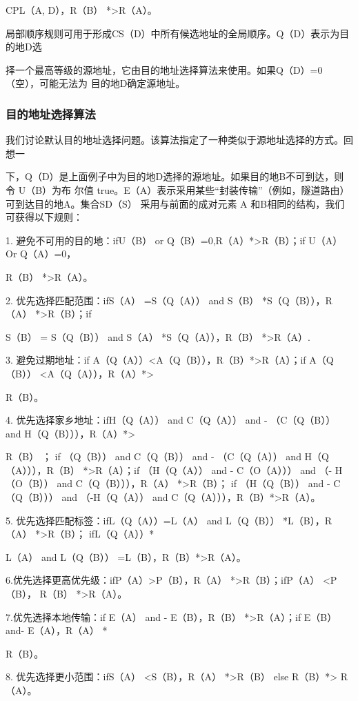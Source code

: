 CPL（A, D），R（B） *>R（A）。

局部顺序规则可用于形成CS（D）中所有候选地址的全局顺序。Q（D）表示为目的地D选

择一个最高等级的源地址，它由目的地址选择算法来使用。如果Q（D）=0（空），可能无法为
目的地D确定源地址。

\subsubsection{目的地址选择算法}
我们讨论默认目的地址选择问题。该算法指定了一种类似于源地址选择的方式。回想一

下，Q（D）是上面例子中为目的地D选择的源地址。如果目的地B不可到达，则令 U（B）为布
尔值 true。E（A）表示采用某些“封装传输”（例如，隧道路由）可到达目的地A。集合SD（S）
采用与前面的成对元素 A 和B相同的结构，我们可获得以下规则：

1. 避免不可用的目的地：ifU（B） or Q（B）=0,R（A）*>R（B）；if U（A） Or Q（A）=0，

R（B） *>R（A）。

2. 优先选择匹配范围：ifS（A） =S（Q（A）） and S（B） *S（Q（B）），R（A） *>R（B）；if

S（B） = S（Q（B）） and S（A） *S（Q（A）），R（B） *>R（A）.

3. 避免过期地址：if A（Q（A））<A（Q（B）），R（B）*>R（A）；if A（Q（B）） <A（Q（A）），R（A）*>

R（B）。

4. 优先选择家乡地址：ifH（Q（A）） and C（Q（A）） and - （C（Q（B）） and H（Q（B））），R（A）*>

R（B） ； if （Q（B）） and C（Q（B）） and - （C（Q（A）） and H（Q（A））），R（B） *>R（A）；if （H（Q（A）） and -
C（O（A））） and （- H（O（B）） and C（Q（B））），R（A） *>R（B）； if （H（Q（B）） and - C（Q（B））） and （-H（Q（A））
and C（Q（A））），R（B）*>R（A）。

5. 优先选择匹配标签：ifL（Q（A））=L（A） and L（Q（B）） *L（B），R（A） *>R（B）； ifL（Q（A））*

L（A） and L（Q（B）） =L（B），R（B）*>R（A）。

6.优先选择更高优先级：ifP（A）>P（B），R（A） *>R（B）；ifP（A） <P（B）， R（B） *>R（A）。

7.优先选择本地传输：if E（A） and - E（B），R（B） *>R（A）；if E（B） and- E（A），R（A） *

R（B）。

8. 优先选择更小范围：ifS（A） <S（B），R（A） *>R（B） else R（B）*> R（A）。

